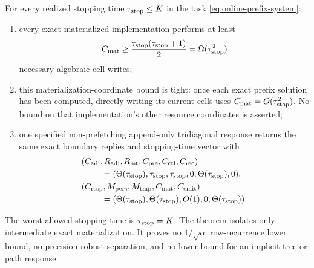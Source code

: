 \begin{theorem}
\label{thm:online-path-resource-separation}
For every realized stopping time $\tau_{\rm stop}\leq K$ in the task
\cref{eq:online-prefix-system}:
\begin{enumerate}[label=(\roman*)]
\item every exact-materialized implementation performs at least
      \begin{equation}
       C_{\rm mat}\geq
       \frac{\tau_{\rm stop}(\tau_{\rm stop}+1)}2
       =\Omega(\tau_{\rm stop}^2)
       \label{eq:path-materialization-lower}
      \end{equation}
      necessary algebraic-cell writes;
\item this materialization-coordinate bound is tight: once each exact prefix
      solution has been computed, directly writing its current cells uses
      $C_{\rm mat}=O(\tau_{\rm stop}^2)$.  No bound on that implementation's
      other resource coordinates is asserted;
\item one specified non-prefetching append-only tridiagonal response returns
      the same exact boundary replies and stopping-time vector with
      \begin{equation}
       \begin{aligned}
       (&C_{\rm adj},R_{\rm adj},R_{\rm int},C_{\rm pre},C_{\rm ctl},
         C_{\rm rec})\\
         &\hspace{2em}=(\Theta(\tau_{\rm stop}),\tau_{\rm stop},
             \tau_{\rm stop},0,\Theta(\tau_{\rm stop}),0),\\
       (&C_{\rm resp},M_{\rm pers},M_{\rm tmp},C_{\rm mat},C_{\rm emit})\\
         &\hspace{2em}=(\Theta(\tau_{\rm stop}),\Theta(\tau_{\rm stop}),
             O(1),0,\Theta(\tau_{\rm stop})).
       \end{aligned}
       \label{eq:path-response-resource-vector}
      \end{equation}
\end{enumerate}
The worst allowed stopping time is $\tau_{\rm stop}=K$.  The theorem isolates
only intermediate exact materialization.  It proves no
$1/\sqrt\alpha$ row-recurrence lower bound, no precision-robust separation,
and no lower bound for an implicit tree or path response.
\end{theorem}

